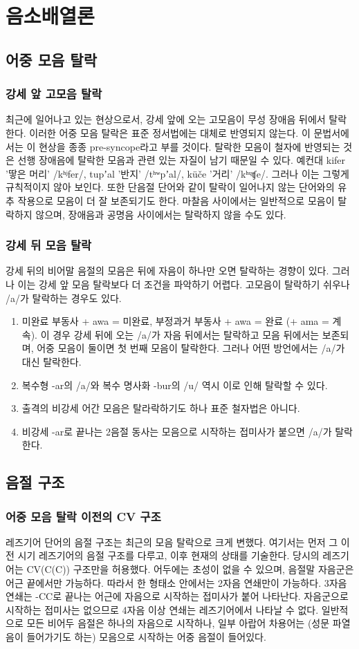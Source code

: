 \section{음소배열론}
\subsection{어중 모음 탈락}
\subsubsection{강세 앞 고모음 탈락}
최근에 일어나고 있는 현상으로서, 강세 앞에 오는 고모음이 무성 장애음 뒤에서 탈락한다. 이러한 어중 모음 탈락은 표준 정서법에는 대체로 반영되지 않는다. 이 문법서에서는 이 현상을 종종 pre-syncope라고 부를 것이다. 탈락한 모음이 철자에 반영되는 것은 선행 장애음에 탈락한 모음과 관련 있는 자질이 남기 때문일 수 있다. 예컨대 kifer '땋은 머리' /kʰʲfer/, tupʼal '반지' /tʰʷpʼal/, küče '거리' /kʰᶣʧe/. 그러나 이는 그렇게 규칙적이지 않아 보인다. 또한 단음절 단어와 같이 탈락이 일어나지 않는 단어와의 유추 작용으로 모음이 더 잘 보존되기도 한다. 마찰음 사이에서는 일반적으로 모음이 탈락하지 않으며, 장애음과 공명음 사이에서는 탈락하지 않을 수도 있다.
\subsubsection{강세 뒤 모음 탈락}
강세 뒤의 비어말 음절의 모음은 뒤에 자음이 하나만 오면 탈락하는 경향이 있다. 그러나 이는 강세 앞 모음 탈락보다 더 조건을 파악하기 어렵다. 고모음이 탈락하기 쉬우나 /a/가 탈락하는 경우도 있다.
\begin{enumerate}
	\item 미완료 부동사 + awa = 미완료, 부정과거 부동사 + awa = 완료 (+ ama = 계속). 이 경우 강세 뒤에 오는 /a/가 자음 뒤에서는 탈락하고 모음 뒤에서는 보존되며, 어중 모음이 둘이면 첫 번째 모음이 탈락한다. 그러나 어떤 방언에서는 /a/가 대신 탈락한다.
	\item 복수형 -ar의 /a/와 복수 명사화 -bur의 /u/ 역시 이로 인해 탈락할 수 있다.
	\item 출격의 비강세 어간 모음은 탈라락하기도 하나 표준 철자법은 아니다.
	\item 비강세 -ar로 끝나는 2음절 동사는 모음으로 시작하는 접미사가 붙으면 /a/가 탈락한다.
\end{enumerate}
\subsection{음절 구조}
\subsubsection{어중 모음 탈락 이전의 CV 구조}
레즈기어 단어의 음절 구조는 최근의 모음 탈락으로 크게 변했다. 여기서는 먼저 그 이전 시기 레즈기어의 음절 구조를 다루고, 이후 현재의 상태를 기술한다. 당시의 레즈기어는 CV(C(C)) 구조만을 허용했다. 어두에는 초성이 없을 수 있으며, 음절말 자음군은 어근 끝에서만 가능하다. 따라서 한 형태소 안에서는 2자음 연쇄만이 가능하다. 3자음 연쇄는 -CC로 끝나는 어근에 자음으로 시작하는 접미사가 붙어 나타난다. 자음군으로 시작하는 접미사는 없으므로 4자음 이상 연쇄는 레즈기어에서 나타날 수 없다. 일반적으로 모든 비어두 음절은 하나의 자음으로 시작하나, 일부 아랍어 차용어는 (성문 파열음이 들어가기도 하는) 모음으로 시작하는 어중 음절이 들어있다.
